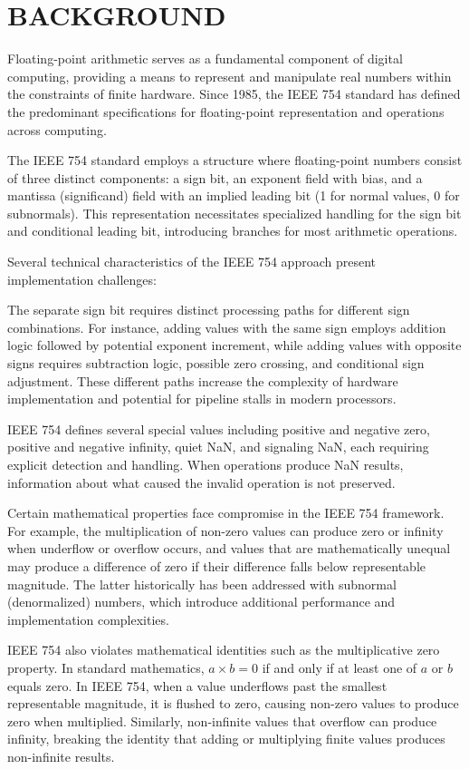 \documentclass[12pt,letter]{article}
\begin{document}
\newpage

\section{BACKGROUND}

Floating-point arithmetic serves as a fundamental component of digital computing, providing a means to represent and manipulate real numbers within the constraints of finite hardware. Since 1985, the IEEE 754 standard has defined the predominant specifications for floating-point representation and operations across computing.

The IEEE 754 standard employs a structure where floating-point numbers consist of three distinct components: a sign bit, an exponent field with bias, and a mantissa (significand) field with an implied leading bit (1 for normal values, 0 for subnormals). This representation necessitates specialized handling for the sign bit and conditional leading bit, introducing branches for most arithmetic operations.

Several technical characteristics of the IEEE 754 approach present implementation challenges:

The separate sign bit requires distinct processing paths for different sign combinations. For instance, adding values with the same sign employs addition logic followed by potential exponent increment, while adding values with opposite signs requires subtraction logic, possible zero crossing, and conditional sign adjustment. These different paths increase the complexity of hardware implementation and potential for pipeline stalls in modern processors.

IEEE 754 defines several special values including positive and negative zero, positive and negative infinity, quiet NaN, and signaling NaN, each requiring explicit detection and handling. When operations produce NaN results, information about what caused the invalid operation is not preserved.

Certain mathematical properties face compromise in the IEEE 754 framework. For example, the multiplication of non-zero values can produce zero or infinity when underflow or overflow occurs, and values that are mathematically unequal may produce a difference of zero if their difference falls below representable magnitude. The latter historically has been addressed with subnormal (denormalized) numbers, which introduce additional performance and implementation complexities.

IEEE 754 also violates mathematical identities such as the multiplicative zero property. In standard mathematics, $a \times b = 0$ if and only if at least one of $a$ or $b$ equals zero. In IEEE 754, when a value underflows past the smallest representable magnitude, it is flushed to zero, causing non-zero values to produce zero when multiplied. Similarly, non-infinite values that overflow can produce infinity, breaking the identity that adding or multiplying finite values produces non-infinite results.
\end{document}
